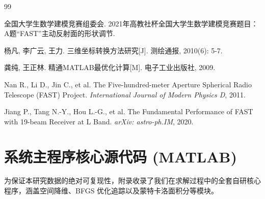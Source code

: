 \documentclass[UTF8,a4paper,zihao=-4]{ctexart}
\begin{document}
\newpage
\begin{thebibliography}{99}

全国大学生数学建模竞赛组委会. 2021年高教社杯全国大学生数学建模竞赛题目：A题“FAST”主动反射面的形状调节.

杨凡, 李广云, 王力. 三维坐标转换方法研究[J]. 测绘通报, 2010(6): 5-7.

龚纯, 王正林. 精通MATLAB最优化计算[M]. 电子工业出版社, 2009.

Nan R., Li D., Jin C., et al. The Five-hundred-meter Aperture Spherical Radio Telescope (FAST) Project. \textit{International Journal of Modern Physics D}, 2011.

Jiang P., Tang N.-Y., Hou L.-G., et al. The Fundamental Performance of FAST with 19-beam Receiver at L Band. \textit{arXiv: astro-ph.IM}, 2020.

\end{thebibliography}

\newpage
\appendix
\section{系统主程序核心源代码 (MATLAB)}

为保证本研究数据的绝对可复现性，附录收录了我们在求解过程中的全套自研核心程序，涵盖空间降维、BFGS 优化追踪以及蒙特卡洛面积分等模块。
\end{document}
